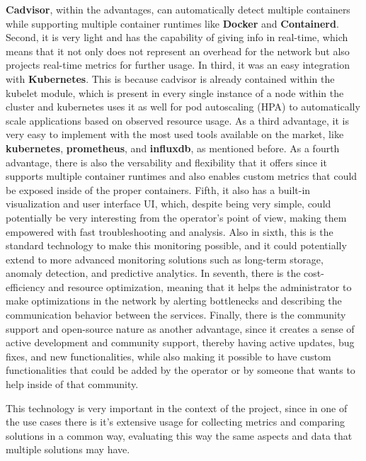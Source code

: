 \textbf{Cadvisor}, within the advantages, can automatically detect multiple containers while supporting multiple container runtimes like \textbf{Docker} and \textbf{Containerd}. Second, it is very light and has the capability of giving info in real-time, which means that it not only does not represent an overhead for the network but also projects real-time metrics for further usage. In third, it was an easy integration with \textbf{Kubernetes}. This is because cadvisor is already contained within the kubelet module, which is present in every single instance of a node within the cluster and kubernetes uses it as well for pod autoscaling (HPA) to automatically scale applications based on observed resource usage. As a third advantage, it is very easy to implement with the most used tools available on the market, like \textbf{kubernetes}, \textbf{prometheus}, and \textbf{influxdb}, as mentioned before. As a fourth advantage, there is also the versability and flexibility that it offers since it supports multiple container runtimes and also enables custom metrics that could be exposed inside of the proper containers. Fifth, it also has a built-in visualization and user interface UI, which, despite being very simple, could potentially be very interesting from the operator's point of view, making them empowered with fast troubleshooting and analysis. Also in sixth, this is the standard technology to make this monitoring possible, and it could potentially extend to more advanced monitoring solutions such as long-term storage, anomaly detection, and predictive analytics. In seventh, there is the cost-efficiency and resource optimization, meaning that it helps the administrator to make optimizations in the network by alerting bottlenecks and describing the communication behavior between the services. Finally, there is the community support and open-source nature as another advantage, since it creates a sense of active development and community support, thereby having active updates, bug fixes, and new functionalities, while also making it possible to have custom functionalities that could be added by the operator or by someone that wants to help inside of that community.

This technology is very important in the context of the project, since in one of the use cases there is it's extensive usage for collecting metrics and comparing solutions in a common way, evaluating this way the same aspects and data that multiple solutions may have.







